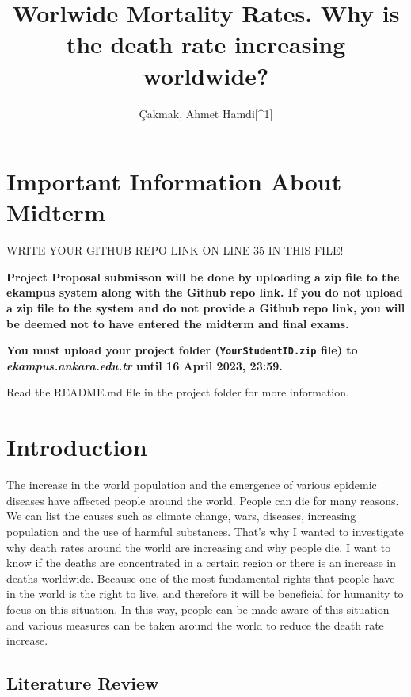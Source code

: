 \documentclass[
  12pt,
]{article}
\title{Worlwide Mortality Rates. Why is the death rate increasing worldwide?}
\author{Çakmak, Ahmet Hamdi{[}\^{}1{]}}
\date{}
\begin{document}
\maketitle

\hypertarget{important-information-about-midterm}{%
\section{Important Information About Midterm}\label{important-information-about-midterm}}

\colorbox{BurntOrange}{WRITE YOUR GITHUB REPO LINK ON LINE 35 IN THIS FILE!}

\textbf{Project Proposal submisson will be done by uploading a zip file to the ekampus system along with the Github repo link. If you do not upload a zip file to the system and do not provide a Github repo link, you will be deemed not to have entered the midterm and final exams.}

\textbf{You must upload your project folder (\texttt{YourStudentID.zip} file) to \emph{ekampus.ankara.edu.tr} until 16 April 2023, 23:59.}

\colorbox{WildStrawberry}{Read the README.md file in the project folder for more information.}

\hypertarget{introduction}{%
\section{Introduction}\label{introduction}}

The increase in the world population and the emergence of various epidemic diseases have affected people around the world. People can die for many reasons. We can list the causes such as climate change, wars, diseases, increasing population and the use of harmful substances. That's why I wanted to investigate why death rates around the world are increasing and why people die. I want to know if the deaths are concentrated in a certain region or there is an increase in deaths worldwide. Because one of the most fundamental rights that people have in the world is the right to live, and therefore it will be beneficial for humanity to focus on this situation. In this way, people can be made aware of this situation and various measures can be taken around the world to reduce the death rate increase.

\hypertarget{literature-review}{%
\subsection{Literature Review}\label{literature-review}}
\end{document}

